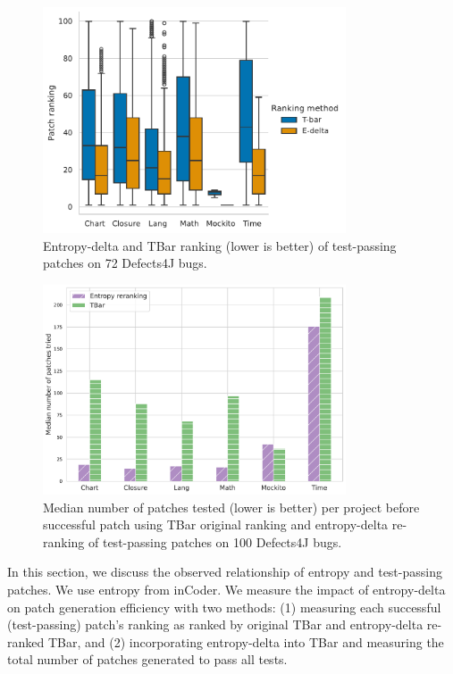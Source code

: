 \documentclass[12pt,openany,oneside,table]{cmuthesis}
\begin{document}
\begin{figure}[t]
  \centering
  \includegraphics[width=0.8\textwidth]{figures/results/untested_ranking_both.pdf}
  \caption{Entropy-delta and TBar ranking (lower is better) of test-passing
  patches on 72 Defects4J bugs.}
  \label{fig:e-delta-efficiency}
\end{figure}

\begin{figure}[t]
  \centering
  \includegraphics[width=0.8\textwidth]{figures/results/untested_num_patches.pdf}
  \caption{Median number of patches tested (lower is better) per project before successful patch using TBar original ranking and entropy-delta re-ranking of test-passing patches on 100 Defects4J bugs.}
  \label{fig:e-delta-num-patches}
\end{figure}

In this section, we discuss the observed relationship of entropy and
test-passing patches. We use entropy from inCoder. We measure the impact of entropy-delta on patch
generation efficiency with two methods: (1) measuring each successful
(test-passing) patch's ranking as ranked by original TBar and entropy-delta
re-ranked TBar, and (2) incorporating entropy-delta into TBar and measuring the
total number of  patches generated to pass all tests. 
\end{document}
